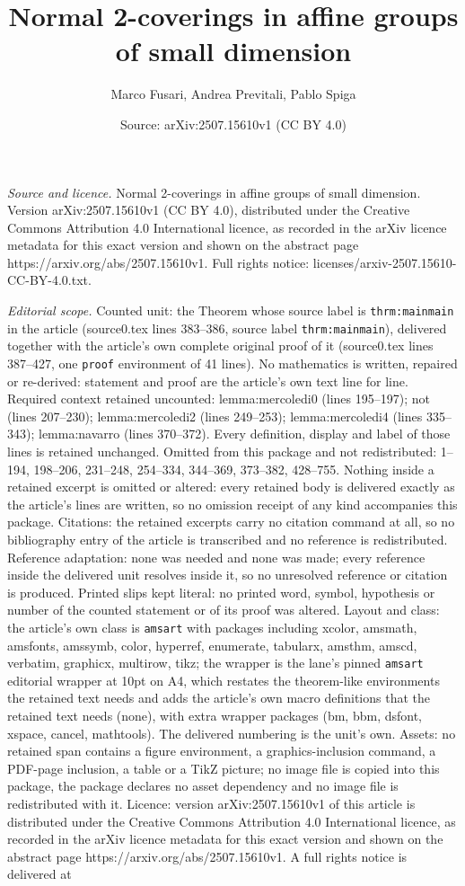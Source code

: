 \documentclass[10pt,a4paper]{amsart}
\title[Normal 2-coverings in affine groups of small dimension]{Normal 2-coverings in affine groups of small dimension}
\author{Marco Fusari, Andrea Previtali, Pablo Spiga}
\date{Source: arXiv:2507.15610v1 (CC BY 4.0)}
\begin{document}
\maketitle

\noindent\emph{Source and licence.} Normal 2-coverings in affine groups of small dimension. Version arXiv:2507.15610v1 (CC BY 4.0), distributed under the Creative Commons Attribution 4.0 International licence, as recorded in the arXiv licence metadata for this exact version and shown on the abstract page https://arxiv.org/abs/2507.15610v1. Full rights notice: licenses/arxiv-2507.15610-CC-BY-4.0.txt.\par\smallskip

\noindent\textit{Editorial scope.} Counted unit: the Theorem whose source label is \texttt{thrm:mainmain} in the article (source0.tex lines 383--386, source label \texttt{thrm:mainmain}), delivered together with the article's own complete original proof of it (source0.tex lines 387--427, one \texttt{proof} environment of 41 lines). No mathematics is written, repaired or re-derived: statement and proof are the article's own text line for line. Required context retained uncounted: lemma:mercoledi0 (lines 195--197); not (lines 207--230); lemma:mercoledi2 (lines 249--253); lemma:mercoledi4 (lines 335--343); lemma:navarro (lines 370--372). Every definition, display and label of those lines is retained unchanged. Omitted from this package and not redistributed: 1--194, 198--206, 231--248, 254--334, 344--369, 373--382, 428--755. Nothing inside a retained excerpt is omitted or altered: every retained body is delivered exactly as the article's lines are written, so no omission receipt of any kind accompanies this package. Citations: the retained excerpts carry no citation command at all, so no bibliography entry of the article is transcribed and no reference is redistributed. Reference adaptation: none was needed and none was made; every reference inside the delivered unit resolves inside it, so no unresolved reference or citation is produced. Printed slips kept literal: no printed word, symbol, hypothesis or number of the counted statement or of its proof was altered. Layout and class: the article's own class is \texttt{amsart} with packages including xcolor, amsmath, amsfonts, amssymb, color, hyperref, enumerate, tabularx, amsthm, amscd, verbatim, graphicx, multirow, tikz; the wrapper is the lane's pinned \texttt{amsart} editorial wrapper at 10pt on A4, which restates the theorem-like environments the retained text needs and adds the article's own macro definitions that the retained text needs (none), with extra wrapper packages (bm, bbm, dsfont, xspace, cancel, mathtools). The delivered numbering is the unit's own. Assets: no retained span contains a figure environment, a graphics-inclusion command, a PDF-page inclusion, a table or a TikZ picture; no image file is copied into this package, the package declares no asset dependency and no image file is redistributed with it. Licence: version arXiv:2507.15610v1 of this article is distributed under the Creative Commons Attribution 4.0 International licence, as recorded in the arXiv licence metadata for this exact version and shown on the abstract page https://arxiv.org/abs/2507.15610v1. A full rights notice is delivered at 
\end{document}

